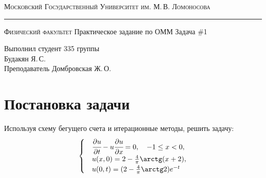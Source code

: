 \documentclass[12pt]{article}
\author{Будакян Я. С.}
\def\dd#1#2{\cfrac{\partial#1}{\partial#2}}
\begin{document}
	\begin{titlepage}
		\begin{center}
			{\small\textsc{Московский Государственный Университет им. М.\,В. Ломоносова}}
			\vskip 1pt \hrule \vskip 3pt
			{\small\textsc{Физический факультет}}
			\vfill
			{\Large Практическое задание по ОММ}
			\break
			\break
			{\Large Задача \#1}	
		\end{center}
		\vfill
		\begin{flushright}
			{Выполнил студент 335 группы\\Будакян Я.\,С.\\
			 Преподаватель Домбровская Ж.\,О.}
		\end{flushright}
	\end{titlepage}
	
	\section{Постановка задачи}
		\bigskip\par{}
		Используя схему бегущего счета и итерационные методы, решить задачу:
		\begin{equation}\label{eq:problem}
			\begin{cases}
				&\dd{u}t - u\dd{u}x = 0, \quad -1 \le x < 0, \\
				&u(x, 0) = 2 - \frac{4}{\pi}\arctg(x+2), \\
				&u(0, t) = (2 - \frac{4}{\pi}\arctg2)e^{-t}
			\end{cases}
		\end{equation}
	
\end{document}
